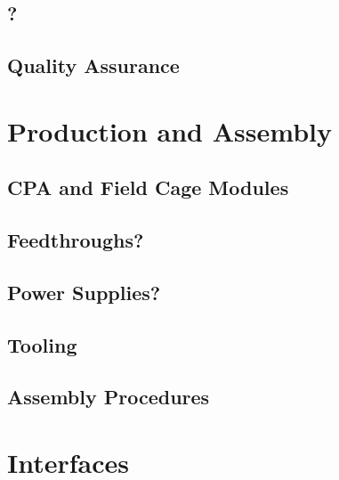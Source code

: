 \subsection{?}
\label{sec:fdsp-hv-?}


\subsection{Quality Assurance}
\label{sec:fdsp-hv-qa}




\section{Production and Assembly}
\label{sec:fdsp-hv-prod-assy}

\subsection{CPA and Field Cage Modules}
\label{sec:fdsp-hv-supplies}

\subsection{Feedthroughs?}
\label{sec:fdsp-hv-feedthroughs}


\subsection{Power Supplies?}
\label{sec:fdsp-hv-supplies}



\subsection{Tooling}
\label{sec:fdsp-hv-tooling}


\subsection{Assembly Procedures}
\label{sec:fdsp-hv-assy}



\section{Interfaces}
\label{sec:fdsp-hv-intfc}

